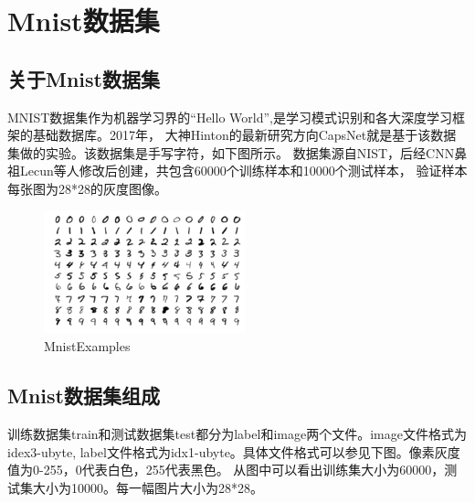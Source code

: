 \section{Mnist数据集}
\label{Ch:Mnist}
\subsection{关于Mnist数据集}
MNIST数据集作为机器学习界的“Hello World”,是学习模式识别和各大深度学习框架的基础数据库。2017年，
大神Hinton的最新研究方向CapsNet就是基于该数据集做的实验。该数据集是手写字符，如下图所示。
数据集源自NIST，后经CNN鼻祖Lecun等人修改后创建，共包含60000个训练样本和10000个测试样本，
验证样本每张图为28*28的灰度图像。
\begin{figure}[thbp!]
  \centering
  \includegraphics[width=0.4\linewidth]{figure/Ch0Mnist/220px-MnistExamples.png}
  \caption{MnistExamples}
  \label{fig:MnistExamples}
\end{figure}

\subsection{Mnist数据集组成}
训练数据集train和测试数据集test都分为label和image两个文件。image文件格式为idex3-ubyte,
label文件格式为idx1-ubyte。具体文件格式可以参见下图。像素灰度值为0-255，0代表白色，255代表黑色。
从图中可以看出训练集大小为60000，测试集大小为10000。每一幅图片大小为28*28。

